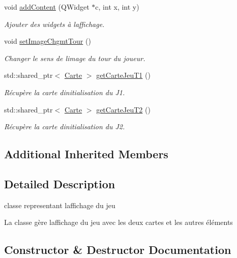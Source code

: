 \begin{DoxyCompactItemize}
void \hyperlink{class_affichage_jeu_aa04e21a18ec82b601605a6ca974ea6d7}{add\+Content} (Q\+Widget $\ast$c, int x, int y)
\begin{DoxyCompactList}\small\item\em Ajouter des widgets à l\textquotesingle{}affichage. \end{DoxyCompactList}\item 
void \hyperlink{class_affichage_jeu_aacb8b0c827d1b623e082546a7a461e11}{set\+Image\+Chgmt\+Tour} ()
\begin{DoxyCompactList}\small\item\em Changer le sens de l\textquotesingle{}image du tour du joueur. \end{DoxyCompactList}\item 
std\+::shared\+\_\+ptr$<$ \hyperlink{class_carte}{Carte} $>$ \hyperlink{class_affichage_jeu_a28cf87eb40e06577ce095413ab1933cf}{get\+Carte\+Jeu\+T1} ()
\begin{DoxyCompactList}\small\item\em Récupère la carte d\textquotesingle{}initialisation du J1. \end{DoxyCompactList}\item 
std\+::shared\+\_\+ptr$<$ \hyperlink{class_carte}{Carte} $>$ \hyperlink{class_affichage_jeu_a8604b85fd85bca4fd7ec1bce8c012d93}{get\+Carte\+Jeu\+T2} ()
\begin{DoxyCompactList}\small\item\em Récupère la carte d\textquotesingle{}initialisation du J2. \end{DoxyCompactList}\end{DoxyCompactItemize}
\subsection*{Additional Inherited Members}


\subsection{Detailed Description}
classe representant l\textquotesingle{}affichage du jeu 

La classe gère l\textquotesingle{}affichage du jeu avec les deux cartes et les autres éléments 

\subsection{Constructor \& Destructor Documentation}
